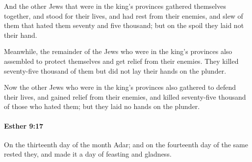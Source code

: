 			\begin{versebox}
					\item[BHS] 
					\item[LXX] 
					\item[ASV] And the other Jews that were in the king's provinces gathered themselves together, and stood for their lives, and had rest from their enemies, and slew of them that hated them seventy and five thousand; but on the spoil they laid not their hand.
					\item[NIV] Meanwhile, the remainder of the Jews who were in the king’s provinces also assembled to protect themselves and get relief from their enemies. They killed seventy-five thousand of them but did not lay their hands on the plunder.
					\item[NRSV] Now the other Jews who were in the king’s provinces also gathered to defend their lives, and gained relief from their enemies, and killed seventy-five thousand of those who hated them; but they laid no hands on the plunder.
			\end{versebox}

		\paragraph{Esther 9:17} %
			\label{ESTHER-9-17}

			On the thirteenth day of the month Adar; and on the fourteenth day of the same rested they, and made it a day of feasting and gladness.


